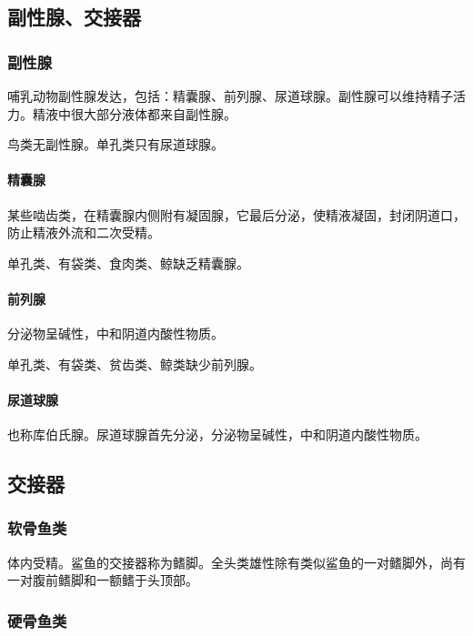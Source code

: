 \subsection{副性腺、交接器}

\subsubsection{副性腺}

哺乳动物副性腺发达，包括：精囊腺、前列腺、尿道球腺。副性腺可以维持精子活力。精液中很大部分液体都来自副性腺。

鸟类无副性腺。单孔类只有尿道球腺。

\paragraph{精囊腺}

某些啮齿类，在精囊腺内侧附有凝固腺，它最后分泌，使精液凝固，封闭阴道口，防止精液外流和二次受精。

单孔类、有袋类、食肉类、鲸缺乏精囊腺。

\paragraph{前列腺}

分泌物呈碱性，中和阴道内酸性物质。

单孔类、有袋类、贫齿类、鲸类缺少前列腺。

\paragraph{尿道球腺}

也称库伯氏腺。尿道球腺首先分泌，分泌物呈碱性，中和阴道内酸性物质。

\subsection{交接器}

\subsubsection{软骨鱼类}

体内受精。鲨鱼的交接器称为鳍脚。全头类雄性除有类似鲨鱼的一对鳍脚外，尚有一对腹前鳍脚和一额鳍于头顶部。

\subsubsection{硬骨鱼类}


